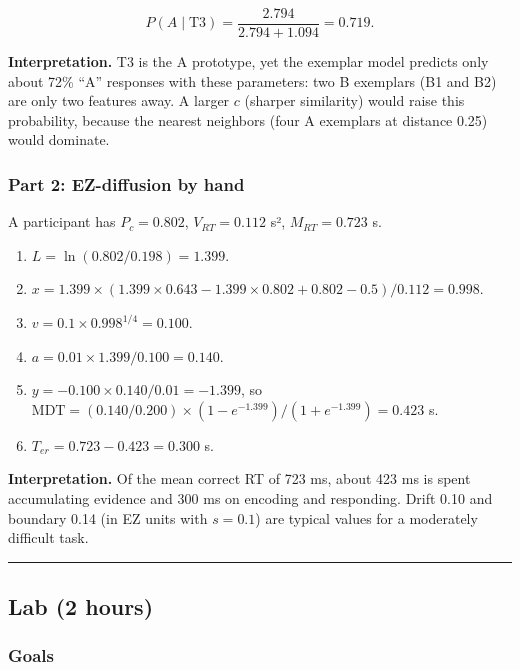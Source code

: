 \[
P(A\mid \text{T3}) = \frac{2.794}{2.794 + 1.094} = 0.719.
\]

\textbf{Interpretation.} T3 is the A prototype, yet the exemplar model
predicts only about 72\% ``A'' responses with these parameters: two B
exemplars (B1 and B2) are only two features away. A larger \(c\)
(sharper similarity) would raise this probability, because the nearest
neighbors (four A exemplars at distance 0.25) would dominate.

\subsubsection{Part 2: EZ-diffusion by hand}

A participant has \(P_c = 0.802\), \(V_{RT} = 0.112\) s²,
\(M_{RT} = 0.723\) s.

\begin{enumerate}
\def\labelenumi{\arabic{enumi}.}
\tightlist
\item
  \(L = \ln(0.802/0.198) = 1.399\).
\item
  \(x = 1.399 \times (1.399 \times 0.643 - 1.399 \times 0.802 + 0.802 - 0.5)/0.112 = 0.998\).
\item
  \(v = 0.1 \times 0.998^{1/4} = 0.100\).
\item
  \(a = 0.01 \times 1.399/0.100 = 0.140\).
\item
  \(y = -0.100 \times 0.140/0.01 = -1.399\), so
  \(\mathrm{MDT} = (0.140/0.200) \times (1 - e^{-1.399})/(1 + e^{-1.399}) = 0.423\)
  s.
\item
  \(T_{er} = 0.723 - 0.423 = 0.300\) s.
\end{enumerate}

\textbf{Interpretation.} Of the mean correct RT of 723 ms, about 423 ms
is spent accumulating evidence and 300 ms on encoding and responding.
Drift 0.10 and boundary 0.14 (in EZ units with \(s = 0.1\)) are typical
values for a moderately difficult task.

\begin{center}\rule{0.5\linewidth}{0.5pt}\end{center}


\subsection{Lab (2 hours)}

\subsubsection{Goals}

